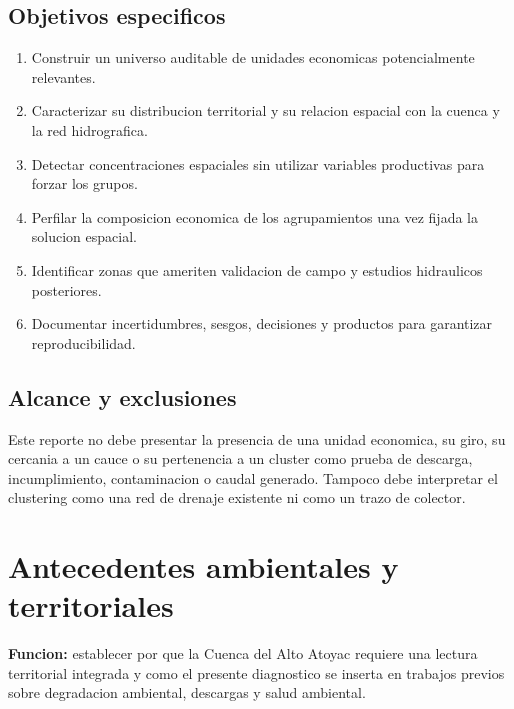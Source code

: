 \documentclass[11pt,letterpaper]{article}
\begin{document}
\subsection{Objetivos especificos}
\begin{enumerate}
    \item Construir un universo auditable de unidades economicas potencialmente relevantes.
    \item Caracterizar su distribucion territorial y su relacion espacial con la cuenca y la red hidrografica.
    \item Detectar concentraciones espaciales sin utilizar variables productivas para forzar los grupos.
    \item Perfilar la composicion economica de los agrupamientos una vez fijada la solucion espacial.
    \item Identificar zonas que ameriten validacion de campo y estudios hidraulicos posteriores.
    \item Documentar incertidumbres, sesgos, decisiones y productos para garantizar reproducibilidad.
\end{enumerate}

\subsection{Alcance y exclusiones}
\begin{alerta}
Este reporte no debe presentar la presencia de una unidad economica, su giro, su cercania a un cauce o su pertenencia a un cluster como prueba de descarga, incumplimiento, contaminacion o caudal generado. Tampoco debe interpretar el clustering como una red de drenaje existente ni como un trazo de colector.
\end{alerta}

\section{Antecedentes ambientales y territoriales}

\textbf{Funcion:} establecer por que la Cuenca del Alto Atoyac requiere una lectura territorial integrada y como el presente diagnostico se inserta en trabajos previos sobre degradacion ambiental, descargas y salud ambiental.
\end{document}
